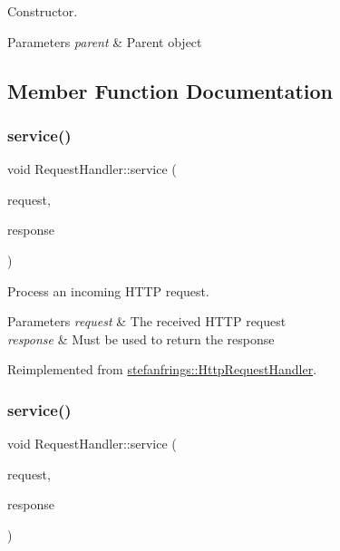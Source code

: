 Constructor. 
\begin{DoxyParams}{Parameters}
{\em parent} & Parent object \\
\hline
\end{DoxyParams}


\subsection{Member Function Documentation}
\mbox{\label{class_request_handler_a46dbcda155cd987e45d55b2941dbfd71}} 
\subsubsection{\texorpdfstring{service()}{service()}\hspace{0.1cm}{\footnotesize\ttfamily [1/2]}}
{\footnotesize\ttfamily void Request\+Handler\+::service (\begin{DoxyParamCaption}\item[{\mbox{\hyperlink{classstefanfrings_1_1_http_request}{Http\+Request}} \&}]{request,  }\item[{\mbox{\hyperlink{classstefanfrings_1_1_http_response}{Http\+Response}} \&}]{response }\end{DoxyParamCaption})\hspace{0.3cm}{\ttfamily [virtual]}}

Process an incoming H\+T\+TP request. 
\begin{DoxyParams}{Parameters}
{\em request} & The received H\+T\+TP request \\
\hline
{\em response} & Must be used to return the response \\
\hline
\end{DoxyParams}


Reimplemented from \mbox{\hyperlink{classstefanfrings_1_1_http_request_handler_a0a7210907152c46b8b5a47feb64cf6bd}{stefanfrings\+::\+Http\+Request\+Handler}}.

\mbox{\label{class_request_handler_a46dbcda155cd987e45d55b2941dbfd71}} 
\subsubsection{\texorpdfstring{service()}{service()}\hspace{0.1cm}{\footnotesize\ttfamily [2/2]}}
{\footnotesize\ttfamily void Request\+Handler\+::service (\begin{DoxyParamCaption}\item[{\mbox{\hyperlink{classstefanfrings_1_1_http_request}{Http\+Request}} \&}]{request,  }\item[{\mbox{\hyperlink{classstefanfrings_1_1_http_response}{Http\+Response}} \&}]{response }\end{DoxyParamCaption})\hspace{0.3cm}{\ttfamily [virtual]}}

